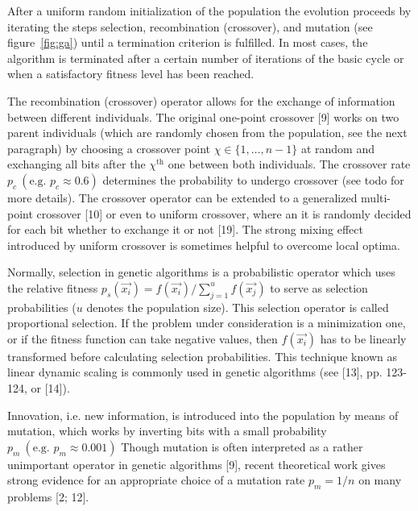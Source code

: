 \documentclass[12pt]{article}
\begin{document}
After a uniform random initialization of the population
the evolution proceeds by iterating the steps selection,
recombination (crossover), and mutation (see figure~\ref{fig:ga})
until a termination criterion is fulfilled.
In most cases, the algorithm is terminated after a certain number of
iterations of the basic cycle or when a satisfactory fitness
level has been reached.

The recombination (crossover) operator allows for the
exchange of information between different individuals. The
original one-point crossover [9] works on two parent individuals
(which are randomly chosen from the population, see the next paragraph)
by choosing a crossover point $ \chi \in \{1, \dots, n-1 \} $
at random and exchanging all bits after the $ \chi^{\text{th}} $ one
between both individuals. The crossover rate
$ p_c \ (\text{e.g. } p_c \approx 0.6) $
determines the probability to undergo crossover (see todo for more details).
The crossover operator can be extended to a generalized
multi-point crossover [10] or even to uniform crossover,
where an it is randomly decided for each bit
whether to exchange it or not [19]. The strong mixing effect
introduced by uniform crossover is sometimes helpful
to overcome local optima.

Normally, selection in genetic algorithms is a probabilistic operator
which uses the relative fitness 
$ p_s \left( \vec{x_i} \right) = 
f \left( \vec{x_i} \right) / \sum_{j=1}^uf \left( \vec{x_j} \right) $
to serve as selection probabilities
($u$ denotes the population size). This selection operator
is called proportional selection. If the problem under
consideration is a minimization one, or if the fitness
function can take negative values, then $ f \left( \vec{x_i} \right) $ has to be
linearly transformed before calculating selection probabilities.
This technique known as linear dynamic scaling is commonly used
in genetic algorithms (see [13], pp. 123-124, or [14]).

Innovation, i.e. new information, is introduced into the
population by means of mutation, which works by inverting
bits with a small probability
$ p_m \ (\text{e.g. } p_m \approx 0.001) $
Though mutation is often interpreted as a rather unimportant operator
in genetic algorithms [9], recent theoretical
work gives strong evidence for an appropriate choice of a
mutation rate $ p_m = 1/n $ on many problems [2; 12].
\end{document}
